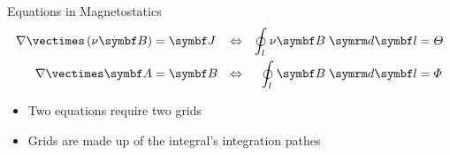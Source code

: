 %
%
%
%
%

\begin{frame}{Equations in Magnetostatics}
  \begin{align*}
    \label{eq:1}
    \nabla\vectimes\left(\nu\vect{B}\right) &= \vect{J} &\Leftrightarrow&&
    \ointeg{l}{\nu\vect{B}}{\vect{l}}&= \Theta \\
    \nabla\vectimes\vect{A} &= \vect{B} &\Leftrightarrow&&
    \ointeg{l}{\vect{B}}{\vect{l}}&= \Phi
  \end{align*}
  \begin{itemize}
  \item Two equations require two grids
  \item Grids are made up of the integral's integration pathes
  \end{itemize}
\end{frame}


